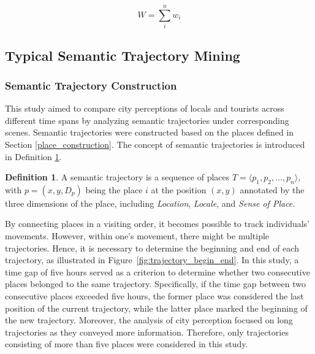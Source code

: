 \documentclass{article}
\theoremstyle{definition}
\newtheorem{definition}{Definition}[section]
\theoremstyle{remark}
\begin{document}
\begin{equation} \label{eq:topic_imputation_W}
    W = \sum_{i}^{n}w_{i}
\end{equation}


\subsection{Typical Semantic Trajectory Mining} \label{typical_semantic_trajectory_mining}

\subsubsection{Semantic Trajectory Construction}
This study aimed to compare city perceptions of locals and tourists across different time spans by analyzing semantic trajectories under corresponding scenes. Semantic trajectories were constructed based on the places defined in Section \ref{place_construction}. The concept of semantic trajectories is introduced in Definition \ref{def:semantic_trajectory}.

\begin{definition} \label{def:semantic_trajectory}
A semantic trajectory is a sequence of places $T = \langle p_{1}, p_{2}, ..., p_{n} \rangle$, with $p = (x,y,D_{p})$ being the place $i$ at the position $(x,y)$ annotated by the three dimensions of the place, including \textit{Location}, \textit{Locale}, and \textit{Sense of Place}.
\end{definition}

By connecting places in a visiting order, it becomes possible to track individuals' movements. However, within one's movement, there might be multiple trajectories. Hence, it is necessary to determine the beginning and end of each trajectory, as illustrated in Figure~\ref{fig:trajectory_begin_end}. In this study, a time gap of five hours served as a criterion to determine whether two consecutive places belonged to the same trajectory. Specifically, if the time gap between two consecutive places exceeded five hours, the former place was considered the last position of the current trajectory, while the latter place marked the beginning of the new trajectory. Moreover, the analysis of city perception focused on long trajectories as they conveyed more information. Therefore, only trajectories consisting of more than five places were considered in this study.
\end{document}
